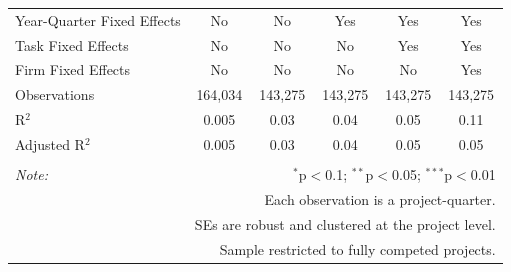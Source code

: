 \documentclass[]{article}
\begin{document}
\begin{table}[H]
\begin{tabular}{@{\extracolsep{-2pt}}lccccc}
Year-Quarter Fixed Effects & No & No & Yes & Yes & Yes \\ 
Task Fixed Effects & No & No & No & Yes & Yes \\ 
Firm Fixed Effects & No & No & No & No & Yes \\ 
Observations & 164,034 & 143,275 & 143,275 & 143,275 & 143,275 \\ 
R$^{2}$ & 0.005 & 0.03 & 0.04 & 0.05 & 0.11 \\ 
Adjusted R$^{2}$ & 0.005 & 0.03 & 0.04 & 0.05 & 0.05 \\ 
\hline 
\hline \\[-1.8ex] 
\textit{Note:}  & \multicolumn{5}{r}{$^{*}$p$<$0.1; $^{**}$p$<$0.05; $^{***}$p$<$0.01} \\ 
 & \multicolumn{5}{r}{Each observation is a project-quarter.} \\ 
 & \multicolumn{5}{r}{SEs are robust and clustered at the project level.} \\ 
 & \multicolumn{5}{r}{Sample restricted to fully competed projects.} \\ 
\end{tabular} 
\end{table}
\end{document}
